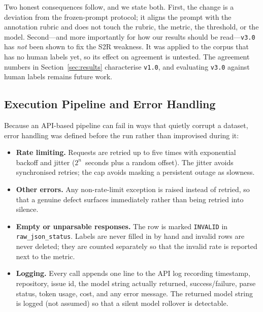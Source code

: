 Two honest consequences follow, and we state both. First, the change is
a deviation from the frozen-prompt protocol; it aligns the prompt with
the annotation rubric and does not touch the rubric, the metric, the
threshold, or the model. Second---and more importantly for how our
results should be read---\texttt{v3.0} has \emph{not} been shown to fix
the S2R weakness. It was applied to the corpus that has no human labels
yet, so its effect on agreement is untested. The agreement numbers in
Section~\ref{sec:results} characterise \texttt{v1.0}, and evaluating
\texttt{v3.0} against human labels remains future work.

\subsection{Execution Pipeline and Error Handling}
\label{sec:method:pipeline}

Because an API-based pipeline can fail in ways that quietly corrupt a
dataset, error handling was defined before the run rather than
improvised during it:

\begin{itemize}
  \item \textbf{Rate limiting.} Requests are retried up to five times
        with exponential backoff and jitter ($2^{n}$~seconds plus a
        random offset). The jitter avoids synchronised retries; the cap
        avoids masking a persistent outage as slowness.
  \item \textbf{Other errors.} Any non-rate-limit exception is raised
        instead of retried, so that a genuine defect surfaces
        immediately rather than being retried into silence.
  \item \textbf{Empty or unparsable responses.} The row is marked
        \texttt{INVALID} in \texttt{raw\_json\_status}. Labels are never
        filled in by hand and invalid rows are never deleted; they are
        counted separately so that the invalid rate is reported next to
        the metric.
  \item \textbf{Logging.} Every call appends one line to the API log
        recording timestamp, repository, issue id, the model string
        actually returned, success/failure, parse status, token usage,
        cost, and any error message. The returned model string is logged
        (not assumed) so that a silent model rollover is detectable.
\end{itemize}

